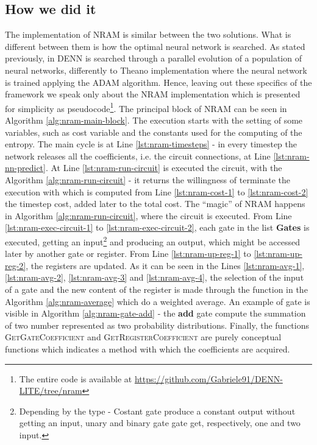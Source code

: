 \subsection{How we did it}
The implementation of NRAM is similar between the two solutions. What is different between them is how the optimal neural network is searched. As stated previously, in DENN is searched through a parallel evolution of a population of neural networks, differently to Theano implementation where the neural network is trained applying the ADAM algorithm. Hence, leaving out these specifics of the framework we speak only about the NRAM implementation which is presented for simplicity as pseudocode\footnote{The entire code is available at \href{https://github.com/Gabriele91/DENN-LITE/tree/nram}{https://github.com/Gabriele91/DENN-LITE/tree/nram}}.\newline
The principal block of NRAM can be seen in Algorithm \ref{alg:nram-main-block}. The execution starts with the setting of some variables, such as cost variable and the constants used for the computing of the entropy. The main cycle is at Line \ref{lst:nram-timesteps} - in every timestep the network releases all the coefficients, i.e. the circuit connections, at Line \ref{lst:nram-nn-predict}. At Line \ref{lst:nram-run-circuit} is executed the circuit, with the Algorithm \ref{alg:nram-run-circuit} - it returns the willingness of terminate the execution with which is computed from Line \ref{lst:nram-cost-1} to \ref{lst:nram-cost-2} the timestep cost, added later to the total cost. The ``magic'' of NRAM happens in Algorithm \ref{alg:nram-run-circuit}, where the circuit is executed. From Line \ref{lst:nram-exec-circuit-1} to \ref{lst:nram-exec-circuit-2}, each gate in the list \textbf{Gates} is executed, getting an input\footnote{Depending by the type - Costant gate produce a constant output without getting an input, unary and binary gate gate get, respectively, one and two input.} and producing an output, which might be accessed later by another gate or register. From Line \ref{lst:nram-up-reg-1} to \ref{lst:nram-up-reg-2}, the registers are updated.
\newline\newline
As it can be seen in the Lines \ref{lst:nram-avg-1}, \ref{lst:nram-avg-2}, \ref{lst:nram-avg-3} and \ref{lst:nram-avg-4}, the selection of the input of a gate and the new content of the register is made through the function in the Algorithm \ref{alg:nram-average} which do a weighted average. An example of gate is visible in Algorithm \ref{alg:nram-gate-add} - the \textbf{add} gate compute the summation of two number represented as two probability distributions. Finally, the functions \textsc{GetGateCoefficient} and \textsc{GetRegisterCoefficient} are purely conceptual functions which indicates a method with which the coefficients are acquired.

